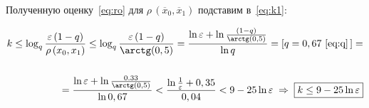 \documentclass[a4paper,12pt]{article}
\begin{document}
Полученную оценку~\eqref{eq:ro} для $\rho\,(\overline{x}_0, \overline{x}_1)$ 
подставим в~\eqref{eq:k1}:

\begin{equation}\begin{split}\label{eq:k2}              
    k \leq \log_q \frac{\varepsilon\,(1-q)}{ \rho\,(x_0,x_1)} \leq
    \log_q \frac{\varepsilon\,(1-q)}{\arctg(0,5)} =
    \frac{\ln\varepsilon + \ln \frac{(1-q)}{\arctg(0,5)}}{\ln q} =
    \left[ q=0,67~\eqref{eq:q}\,\right] = \\\\ =
    \frac{\ln\varepsilon + \ln \frac{0.33}{\arctg(0,5)}}{\ln 0,67} <
    \frac{\ln\frac1\varepsilon +0,35}{0,04} <
    9 - 25\ln\varepsilon      \;\Rightarrow\;
    \boxed{ k \leq 9 - 25\ln\varepsilon }
\end{split}\end{equation}
\par\bigskip
\end{document}
